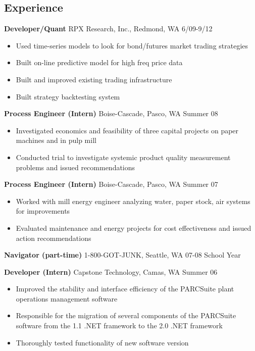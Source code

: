 \documentclass[margin]{res}
\begin{document}
 
 
\begin{resume} 
 

\section{Experience}
  {\bf Developer/Quant} RPX Research, Inc., Redmond, WA \hfill 6/09-9/12 
    \vspace{6pt}
   \begin{itemize} \itemsep -2pt  %
     \item Used time-series models to look for bond/futures market trading strategies 
     \item Built on-line predictive model for high freq price data 
     \item Built and improved existing trading infrastructure
     \item Built strategy backtesting system
   \end{itemize}

  {\bf Process Engineer (Intern)} Boise-Cascade, Pasco, WA \hfill  Summer 08
    \vspace{6pt}
  \begin{itemize} \itemsep -2pt %
    \item Investigated economics and feasibility of three capital projects on paper machines and in pulp mill 
    \item Conducted trial to investigate systemic product quality measurement problems and issued recommendations 
  \end{itemize}

  {\bf Process Engineer (Intern)} Boise-Cascade, Pasco, WA \hfill  Summer 07
    \vspace{6pt}
  \begin{itemize} \itemsep -2pt
    \item Worked with mill energy engineer analyzing water, paper stock, air systems for improvements 
    \item Evaluated maintenance and energy projects for cost effectiveness and issued action recommendations 
   \end{itemize}

  {\bf Navigator (part-time)} 1-800-GOT-JUNK, Seattle, WA \hfill  07-08 School Year

  {\bf Developer (Intern)} Capstone Technology, Camas, WA \hfill  Summer 06
    \vspace{6pt}
  \begin{itemize} \itemsep -2pt
    \item Improved the stability and interface efficiency of the PARCSuite plant operations management software 
    \item Responsible for the migration of several components of the PARCSuite software from the 1.1 .NET framework to the 2.0 .NET framework 
    \item Thoroughly tested functionality of new software version 
   \end{itemize}


\end{resume}
\end{document}
